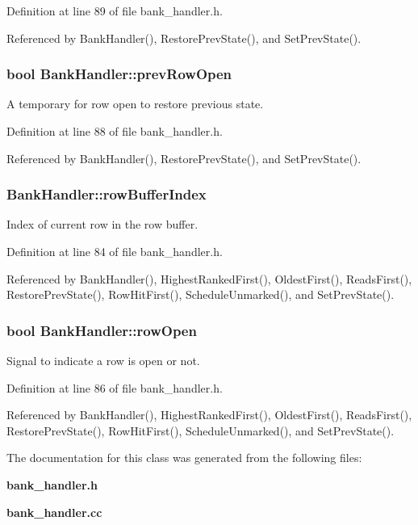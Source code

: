 Definition at line 89 of file bank\_\-handler.h.

Referenced by BankHandler(), RestorePrevState(), and SetPrevState().
\subsubsection[{prevRowOpen}]{\setlength{\rightskip}{0pt plus 5cm}bool {\bf BankHandler::prevRowOpen}}\label{classBankHandler_569ae5a6b277a7176247337572904f7a}


A temporary for row open to restore previous state. 



Definition at line 88 of file bank\_\-handler.h.

Referenced by BankHandler(), RestorePrevState(), and SetPrevState().
\subsubsection[{rowBufferIndex}]{ {\bf BankHandler::rowBufferIndex}}\label{classBankHandler_dee67bbdd725a3645b6057ecfc8f68fd}


Index of current row in the row buffer. 



Definition at line 84 of file bank\_\-handler.h.

Referenced by BankHandler(), HighestRankedFirst(), OldestFirst(), ReadsFirst(), RestorePrevState(), RowHitFirst(), ScheduleUnmarked(), and SetPrevState().
\subsubsection[{rowOpen}]{\setlength{\rightskip}{0pt plus 5cm}bool {\bf BankHandler::rowOpen}}\label{classBankHandler_69610e59acd2cf10bdeb3c6921f29094}


Signal to indicate a row is open or not. 



Definition at line 86 of file bank\_\-handler.h.

Referenced by BankHandler(), HighestRankedFirst(), OldestFirst(), ReadsFirst(), RestorePrevState(), RowHitFirst(), ScheduleUnmarked(), and SetPrevState().

The documentation for this class was generated from the following files:\begin{CompactItemize}
\item 
{\bf bank\_\-handler.h}\item 
{\bf bank\_\-handler.cc}\end{CompactItemize}
